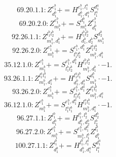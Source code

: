 \documentclass[letterpaper,10pt,fleqn,leqno,onecolumn]{article}
\begin{document}
\begin{equation} \;\;\;\;\;\;  69.20.1.1: Z^{e_{1}^{b}}_{d_{1}^{b}}+=H^{e_{1}^{b},l_{1}^{a}}_{d_{1}^{b},d_{1}^{a}}S^{d_{1}^{a}}_{l_{1}^{a}} \end{equation}
\begin{equation} \;\;\;\;\;\;  69.20.2.0: Z^{e_{1}^{b}}_{m_{1}^{b}}+=S^{d_{1}^{b}}_{m_{1}^{b}}Z^{e_{1}^{b}}_{d_{1}^{b}} \end{equation}
\begin{equation} \;\;\;\;\;\;  92.26.1.1: Z^{l_{1}^{b}l_{2}^{b}}_{m_{1}^{b},d_{1}^{b}}+=H^{l_{1}^{b}l_{2}^{b}}_{d_{1}^{b},d_{2}^{b}}S^{d_{2}^{b}}_{m_{1}^{b}} \end{equation}
\begin{equation} \;\;\;\;\;\;  92.26.2.0: Z^{e_{1}^{b}}_{m_{1}^{b}}+=S^{e_{1}^{b},d_{1}^{b}}_{l_{1}^{b}l_{2}^{b}}Z^{l_{1}^{b}l_{2}^{b}}_{m_{1}^{b},d_{1}^{b}} \end{equation}
\begin{equation} \;\;\;\;\;\;  35.12.1.0: Z^{e_{1}^{b}}_{m_{1}^{b}}+=S^{e_{1}^{b},d_{1}^{b}}_{l_{1}^{b}l_{2}^{b}}H^{l_{1}^{b}l_{2}^{b}}_{m_{1}^{b},d_{1}^{b}}\cdot -1. \end{equation}
\begin{equation} \;\;\;\;\;\;  93.26.1.1: Z^{l_{1}^{a}l_{1}^{b}}_{m_{1}^{b},d_{1}^{a}}+=H^{l_{1}^{a}l_{1}^{b}}_{d_{1}^{b},d_{1}^{a}}S^{d_{1}^{b}}_{m_{1}^{b}}\cdot -1. \end{equation}
\begin{equation} \;\;\;\;\;\;  93.26.2.0: Z^{e_{1}^{b}}_{m_{1}^{b}}+=S^{e_{1}^{b},d_{1}^{a}}_{l_{1}^{a}l_{1}^{b}}Z^{l_{1}^{a}l_{1}^{b}}_{m_{1}^{b},d_{1}^{a}} \end{equation}
\begin{equation} \;\;\;\;\;\;  36.12.1.0: Z^{e_{1}^{b}}_{m_{1}^{b}}+=S^{e_{1}^{b},d_{1}^{a}}_{l_{1}^{a}l_{1}^{b}}H^{l_{1}^{a}l_{1}^{b}}_{m_{1}^{b},d_{1}^{a}}\cdot -1. \end{equation}
\begin{equation} \;\;\;\;\;\;  96.27.1.1: Z^{l_{1}^{b}}_{d_{1}^{b}}+=H^{l_{1}^{b},l_{2}^{b}}_{d_{1}^{b},d_{2}^{b}}S^{d_{2}^{b}}_{l_{2}^{b}} \end{equation}
\begin{equation} \;\;\;\;\;\;  96.27.2.0: Z^{e_{1}^{b}}_{m_{1}^{b}}+=S^{e_{1}^{b},d_{1}^{b}}_{m_{1}^{b},l_{1}^{b}}Z^{l_{1}^{b}}_{d_{1}^{b}} \end{equation}
\begin{equation} \;\;\;\;\;\;  100.27.1.1: Z^{l_{1}^{b}}_{d_{1}^{b}}+=H^{l_{1}^{b},l_{1}^{a}}_{d_{1}^{b},d_{1}^{a}}S^{d_{1}^{a}}_{l_{1}^{a}} \end{equation}
\end{document}
